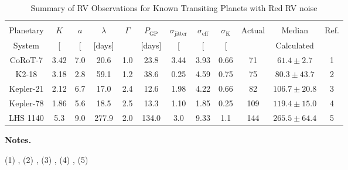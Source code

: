 \begin{table*}
  \small
  \renewcommand{\arraystretch}{0.7}
  \caption{Summary of RV Observations for Known Transiting Planets with Red RV noise}
  \label{RVFCtable:compare_red}
  \begin{tabular}{cccccccccccc}
    \hline \\ [-1ex]
    Planetary & $K$ & $a$ & $\lambda$ & $\Gamma$ & $P_{\text{GP}}$ & $\sigma_{\text{jitter}}$ & $\sigma_{\text{eff}}$ & $\sigma_{\text{K}} $ & Actual & Median & Ref. \\
    System & [\mps{]} & [\mps{]} & [days] & & [days] & [\mps{]} & [\mps{]} & [\mps{]} & \nrv{} & Calculated \nrv{} \\
    \hline
    CoRoT-7 & 3.42 & 7.0 & 20.6 & 1.0 & 23.8 & 3.44 & 3.93 & 0.66 & 71 & $61.4 \pm 2.7$ & 1 \\
    K2-18 & 3.18 & 2.8 & 59.1 & 1.2 & 38.6 & 0.25 & 4.59 & 0.75 & 75 & $80.3 \pm 43.7$ & 2 \\
    Kepler-21 & 2.12 & 6.7 & 17.0 & 2.4 & 12.6 & 1.98 & 4.22 & 0.66 & 82 & $106.7 \pm 20.8$ & 3\\
    Kepler-78 & 1.86 & 5.6 & 18.5 & 2.5 & 13.3 & 1.10 & 1.85 & 0.25 & 109 & $119.4 \pm 15.0$ & 4\\
    LHS 1140 & 5.3 & 9.0 & 277.9 & 2.0 & 134.0 & 3.0 & 9.33 & 1.1 & 144 & $265.5 \pm 64.4$ & 5
  \end{tabular}
  \begin{list}{}{}
  \item {\bf{Notes.}}
  \item (1) \cite{haywood14}, (2) \cite{cloutier17b}, (3) \cite{lopezmorales16}, (4) \cite{grunblatt15}, (5) \cite{dittmann17}
  \end{list}  
\end{table*}

